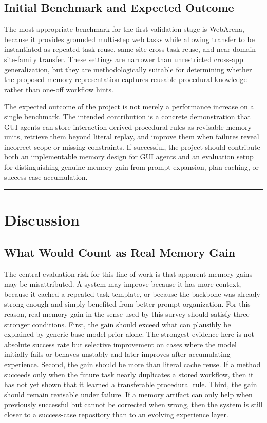 \documentclass{article}
\begin{document}
\subsection{Initial Benchmark and Expected
Outcome}\label{85-initial-benchmark-and-expected-outcome}

The most appropriate benchmark for the first validation stage is
WebArena, because it provides grounded multi-step web tasks while
allowing transfer to be instantiated as repeated-task reuse, same-site
cross-task reuse, and near-domain site-family transfer. These settings
are narrower than unrestricted cross-app generalization, but they are
methodologically suitable for determining whether the proposed memory
representation captures reusable procedural knowledge rather than one-off
workflow hints.

The expected outcome of the project is not merely a performance increase
on a single benchmark. The intended contribution is a concrete
demonstration that GUI agents can store interaction-derived procedural
rules as revisable memory units, retrieve them beyond literal replay,
and improve them when failures reveal incorrect scope or missing
constraints. If successful, the project should contribute both an
implementable memory design for GUI agents and an evaluation setup for
distinguishing genuine memory gain from prompt expansion, plan caching,
or success-case accumulation.

\begin{center}\rule{0.5\linewidth}{0.5pt}\end{center}

\section{Discussion}\label{9-discussion}

\subsection{What Would Count as Real Memory
Gain}\label{91-what-would-count-as-real-memory-gain}

The central evaluation risk for this line of work is that apparent
memory gains may be misattributed. A system may improve because it has
more context, because it cached a repeated task template, or because the
backbone was already strong enough and simply benefited from better
prompt organization. For this reason, real memory gain in the sense used
by this survey should satisfy three stronger conditions. First, the gain
should exceed what can plausibly be explained by generic base-model
prior alone. The strongest evidence here is not absolute success rate
but selective improvement on cases where the model initially fails or
behaves unstably and later improves after accumulating experience.
Second, the gain should be more than literal cache reuse. If a method
succeeds only when the future task nearly duplicates a stored workflow,
then it has not yet shown that it learned a transferable procedural
rule. Third, the gain should remain revisable under failure. If a memory
artifact can only help when previously successful but cannot be
corrected when wrong, then the system is still closer to a success-case
repository than to an evolving experience layer.
\end{document}
